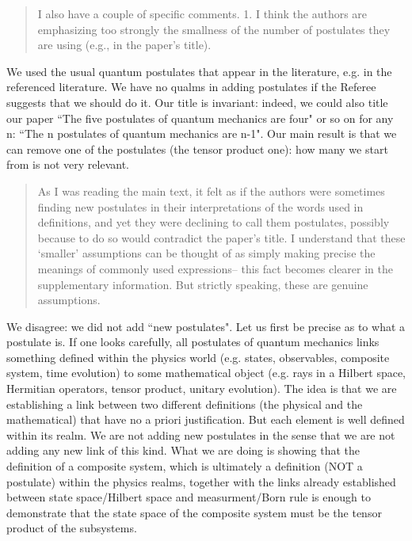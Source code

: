\documentclass[11pt]{article}
\begin{document}
\begin{quote}
I also have a couple of specific comments. 1. I think the
authors are emphasizing too strongly the smallness of the number of
postulates they are using (e.g., in the paper's title).
\end{quote}

We used the usual quantum postulates that appear in the literature,
e.g. in the referenced literature. We have no qualms in adding
postulates if the Referee suggests that we should do it. Our title is
invariant: indeed, we could also title our paper ``The five postulates
of quantum mechanics are four" or so on for any n: ``The n postulates
of quantum mechanics are n-1". Our main result is that we can remove
one of the postulates (the tensor product one): how many we start from
is not very relevant.

\begin{quote} As I was
reading the main text, it felt as if the authors were sometimes
finding new postulates in their interpretations of the words used in
definitions, and yet they were declining to call them postulates,
possibly because to do so would contradict the paper's title. I
understand that these `smaller' assumptions can be thought of as
simply making precise the meanings of commonly used expressions-- this
fact becomes clearer in the supplementary information. But strictly speaking, these are genuine assumptions.\end{quote}

We disagree: we did not add ``new postulates". 
Let us first be precise as to what a postulate is.
If one looks carefully, all postulates of quantum mechanics links something
defined within the physics world (e.g. states, observables, composite system,
time evolution) to some mathematical object (e.g. rays in a Hilbert space, Hermitian
operators, tensor product, unitary evolution). The idea is that we are
establishing a link between two different definitions (the physical
and the mathematical) that have no a priori justification. But each
element is well defined within its realm. We are not adding new postulates in the sense that we are not adding any
new link of this kind. What we are doing is showing that the definition of 
a composite system, which is ultimately a definition (NOT a postulate) within the physics
realms, together with the links already established between state space/Hilbert
space and measurment/Born rule is enough to demonstrate that the state space of the composite
system must be the tensor product of the subsystems.
\end{document}
